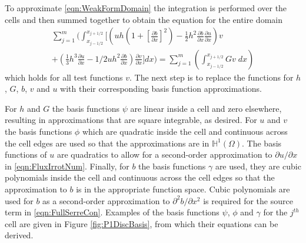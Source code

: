 \documentclass[times]{elsarticle}
\begin{document}
To approximate \eqref{eqn:WeakFormDomain} the integration is performed over the cells and then summed together to obtain the equation for the entire domain
\begin{multline}
\label{eq:elementwiseint}
\sum_{j=1}^m \Bigg(  \int_{x_{j-1/2} }^{{x_{j+1/2}}} \Bigg[  \left( uh \left(1 + \left[\frac{\partial b}{\partial x}\right]^2 \right)  - \frac{1}{2}h^2\frac{\partial b}{\partial x}  \frac{\partial u }{\partial x} \right) v   \\ +  \left(\frac{1}{3}h^3  \frac{\partial {u}}{\partial x}    -     1/2 uh^2\frac{\partial b}{\partial x}    \right) \frac{\partial v }{\partial x} \Bigg]dx \Bigg)  =  \sum_{j=1}^m \left( \int_{x_{j-1/2} }^{{x_{j+1/2}}} Gv \; dx  \right)
\end{multline}
which holds for all test functions $v$. The next step is to replace the functions for $h$, $G$, $b$, $v$ and $u$ with their corresponding basis function approximations.

For $h$ and $G$ the basis functions $\psi$ are linear inside a cell and zero elsewhere, resulting in approximations that are square integrable, as desired.
For $u$ and $v$ the basis functions $\phi$ which are quadratic inside the cell and continuous across the cell edges are used so that the approximations are in $\mathbb{H}^{1}(\Omega)$. The basis functions of $u$ are quadratics to allow for a second-order approximation to $\partial u / \partial x$ in \eqref{eqn:FluxIrrotNum}. Finally, for $b$ the basis functions $\gamma$ are used, they are cubic polynomials inside the cell and continuous across the cell edges so that the approximation to $b$ is in the appropriate function space. Cubic polynomials are used for $b$ as a second-order approximation to $\partial^2 b / \partial x^2$ is required for the source term in \eqref{eqn:FullSerreCon}. Examples of the basis functions $\psi$, $\phi$ and $\gamma$ for the $j^{th}$ cell are given in Figure \ref{fig:P1DiscBasis}, from which their equations can be derived.
\end{document}
